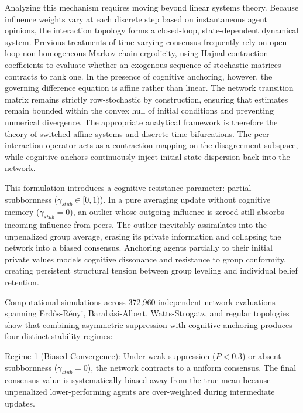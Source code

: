 Analyzing this mechanism requires moving beyond linear systems theory\cite{degroot1974reaching}. Because influence weights vary at each discrete step based on instantaneous agent opinions, the interaction topology forms a closed-loop, state-dependent dynamical system\cite{degroot1974reaching,hajnal1958weak}. Previous treatments of time-varying consensus frequently rely on open-loop non-homogeneous Markov chain ergodicity, using Hajnal contraction coefficients to evaluate whether an exogenous sequence of stochastic matrices contracts to rank one\cite{degroot1974reaching,hajnal1958weak}. In the presence of cognitive anchoring, however, the governing difference equation is affine rather than linear\cite{acemoglu2013opinion,hajnal1958weak}. The network transition matrix remains strictly row-stochastic by construction, ensuring that estimates remain bounded within the convex hull of initial conditions and preventing numerical divergence\cite{degroot1974reaching}. The appropriate analytical framework is therefore the theory of switched affine systems and discrete-time bifurcations\cite{acemoglu2013opinion,hajnal1958weak}. The peer interaction operator acts as a contraction mapping on the disagreement subspace, while cognitive anchors continuously inject initial state dispersion back into the network\cite{acemoglu2013opinion,hajnal1958weak}.

This formulation introduces a cognitive resistance parameter: partial stubbornness ($\gamma_{stub} \in [0, 1)$)\cite{degroot1974reaching}. In a pure averaging update without cognitive memory ($\gamma_{stub} = 0$), an outlier whose outgoing influence is zeroed still absorbs incoming influence from peers\cite{degroot1974reaching}. The outlier inevitably assimilates into the unpenalized group average, erasing its private information and collapsing the network into a biased consensus\cite{degroot1974reaching}. Anchoring agents partially to their initial private values models cognitive dissonance and resistance to group conformity, creating persistent structural tension between group leveling and individual belief retention\cite{degroot1974reaching}.

Computational simulations across 372,960 independent network evaluations spanning Erdős-Rényi, Barabási-Albert, Watts-Strogatz, and regular topologies show that combining asymmetric suppression with cognitive anchoring produces four distinct stability regimes\cite{degroot1974reaching,acemoglu2013opinion}:

Regime 1 (Biased Convergence): Under weak suppression ($P < 0.3$) or absent stubbornness ($\gamma_{stub} = 0$), the network contracts to a uniform consensus\cite{degroot1974reaching,acemoglu2013opinion}. The final consensus value is systematically biased away from the true mean because unpenalized lower-performing agents are over-weighted during intermediate updates\cite{degroot1974reaching}.

